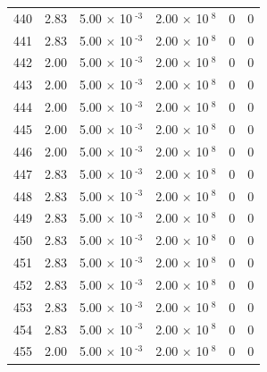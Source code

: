 \documentclass[a4paper,11pt]{article}
\begin{document}
\begin{center}
\begin{longtable}{|R{1.5cm}|R{2.4cm}|R{2.4cm}|R{2.4cm}|R{2.4cm}|R{2.4cm}|}
  440 &   2.83  &         5.00 $\times$ 10$^{\text{          -3}}$  &         2.00 $\times$ 10$^{\text{           8}}$  & 0  & 0 \\
  441 &   2.83  &         5.00 $\times$ 10$^{\text{          -3}}$  &         2.00 $\times$ 10$^{\text{           8}}$  & 0  & 0 \\
  442 &   2.00  &         5.00 $\times$ 10$^{\text{          -3}}$  &         2.00 $\times$ 10$^{\text{           8}}$  & 0  & 0 \\
  443 &   2.00  &         5.00 $\times$ 10$^{\text{          -3}}$  &         2.00 $\times$ 10$^{\text{           8}}$  & 0  & 0 \\
  444 &   2.00  &         5.00 $\times$ 10$^{\text{          -3}}$  &         2.00 $\times$ 10$^{\text{           8}}$  & 0  & 0 \\
  445 &   2.00  &         5.00 $\times$ 10$^{\text{          -3}}$  &         2.00 $\times$ 10$^{\text{           8}}$  & 0  & 0 \\
  446 &   2.00  &         5.00 $\times$ 10$^{\text{          -3}}$  &         2.00 $\times$ 10$^{\text{           8}}$  & 0  & 0 \\
  447 &   2.83  &         5.00 $\times$ 10$^{\text{          -3}}$  &         2.00 $\times$ 10$^{\text{           8}}$  & 0  & 0 \\
  448 &   2.83  &         5.00 $\times$ 10$^{\text{          -3}}$  &         2.00 $\times$ 10$^{\text{           8}}$  & 0  & 0 \\
  449 &   2.83  &         5.00 $\times$ 10$^{\text{          -3}}$  &         2.00 $\times$ 10$^{\text{           8}}$  & 0  & 0 \\
  450 &   2.83  &         5.00 $\times$ 10$^{\text{          -3}}$  &         2.00 $\times$ 10$^{\text{           8}}$  & 0  & 0 \\
  451 &   2.83  &         5.00 $\times$ 10$^{\text{          -3}}$  &         2.00 $\times$ 10$^{\text{           8}}$  & 0  & 0 \\
  452 &   2.83  &         5.00 $\times$ 10$^{\text{          -3}}$  &         2.00 $\times$ 10$^{\text{           8}}$  & 0  & 0 \\
  453 &   2.83  &         5.00 $\times$ 10$^{\text{          -3}}$  &         2.00 $\times$ 10$^{\text{           8}}$  & 0  & 0 \\
  454 &   2.83  &         5.00 $\times$ 10$^{\text{          -3}}$  &         2.00 $\times$ 10$^{\text{           8}}$  & 0  & 0 \\
  455 &   2.00  &         5.00 $\times$ 10$^{\text{          -3}}$  &         2.00 $\times$ 10$^{\text{           8}}$  & 0  & 0 \\

\end{longtable}
\end{center}
\end{document}

